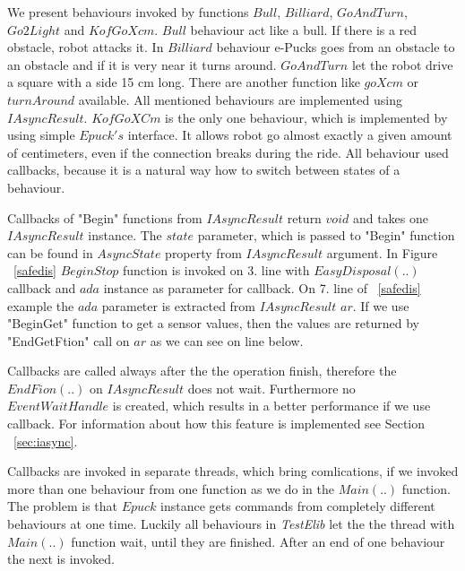 \documentclass[12pt,notitlepage]{report}
\begin{document}
	We present behaviours invoked by functions $Bull$, $Billiard$, $GoAndTurn$,$Go2Light$ and $KofGoXcm$.
	$Bull$ behaviour act like a bull. If there is a red obstacle, robot attacks it. 
	In $Billiard$ behaviour e-Pucks goes from an obstacle to an obstacle
	and if it is very near it turns around.
	$GoAndTurn$ let the robot drive a square with a side 15 cm long. 
	There are another function like $goXcm$ or $turnAround$ available.
	All mentioned behaviours are implemented using $IAsyncResult$. 
	$KofGoXCm$ is the only one behaviour, which is implemented by using simple $Epuck's$ interface.
	It allows robot go almost exactly a given amount of centimeters, even if the connection breaks during the ride.
	All behaviour used  callbacks, because it is a natural way how to switch between states of a behaviour.

	Callbacks of "Begin" functions from $IAsyncResult$ return $void$ and takes one $IAsyncResult$ instance.
	The $state$ parameter, which is passed to "Begin" function can be found in $AsyncState$ property from $IAsyncResult$ argument.
	In Figure ~\ref{safedis} $BeginStop$ function is invoked on 3. line with $EasyDisposal(..)$ callback 
	and $ada$ instance as parameter for callback.
	On 7. line of ~\ref{safedis} example the $ada$ parameter is extracted from $IAsyncResult$ $ar$.
	If we use "BeginGet" function to get a sensor values, then the values are returned by "EndGetFtion" call on $ar$ as we can see
	on line below.

	Callbacks are called always after the the operation finish, therefore the $EndFion(..)$ on $IAsyncResult$ does not wait.
	Furthermore no $EventWaitHandle$ is created, which results in a better performance if we use callback.
	For information about how this feature is implemented see Section ~\ref{sec:iasync}.

	Callbacks are invoked in separate threads, which bring comlications, if we invoked more than one behaviour
	from one function as we do in the $Main(..)$ function. The problem is that $Epuck$ instance gets 
	commands from completely different behaviours at one time.
	Luckily all behaviours in {\it TestElib} let the the thread with $Main(..)$ function wait, until they are finished.
	After an end of one behaviour the next is invoked.
\end{document}
